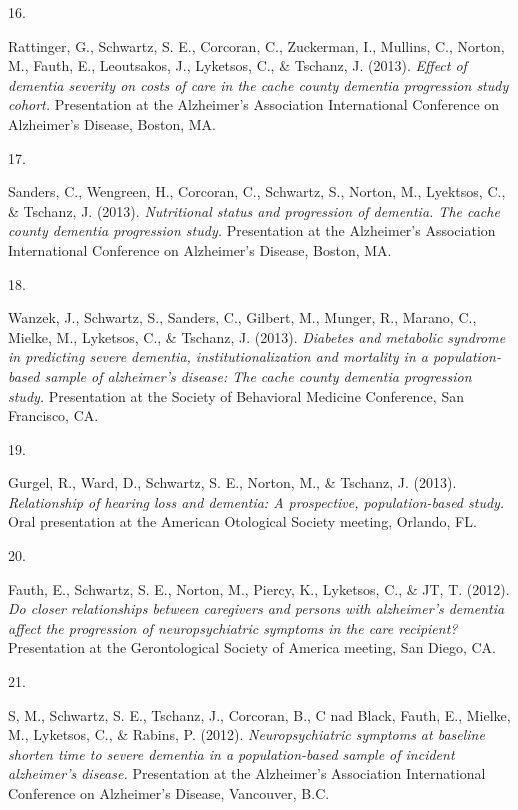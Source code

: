 \documentclass[11pt,a4paper,]{moderncv}
\newlength{\csllabelwidth}
\newcommand{\CSLLeftMargin}[1]{\parbox[t]{\csllabelwidth}{#1}}
\newcommand{\CSLRightInline}[1]{\parbox[t]{\linewidth - \csllabelwidth}{#1}}
\begin{document}
\leavevmode\hypertarget{ref-gail2013pres}{}%
\CSLLeftMargin{16. }
\CSLRightInline{Rattinger, G., Schwartz, S. E., Corcoran, C., Zuckerman,
I., Mullins, C., Norton, M., Fauth, E., Leoutsakos, J., Lyketsos, C., \&
Tschanz, J. (2013). \emph{Effect of dementia severity on costs of care
in the cache county dementia progression study cohort.} Presentation at
the Alzheimer's Association International Conference on Alzheimer's
Disease, Boston, MA.}

\leavevmode\hypertarget{ref-sanders2013pres}{}%
\CSLLeftMargin{17. }
\CSLRightInline{Sanders, C., Wengreen, H., Corcoran, C., Schwartz, S.,
Norton, M., Lyektsos, C., \& Tschanz, J. (2013). \emph{Nutritional
status and progression of dementia. The cache county dementia
progression study.} Presentation at the Alzheimer's Association
International Conference on Alzheimer's Disease, Boston, MA.}

\leavevmode\hypertarget{ref-wanzek2013pres}{}%
\CSLLeftMargin{18. }
\CSLRightInline{Wanzek, J., Schwartz, S., Sanders, C., Gilbert, M.,
Munger, R., Marano, C., Mielke, M., Lyketsos, C., \& Tschanz, J. (2013).
\emph{Diabetes and metabolic syndrome in predicting severe dementia,
institutionalization and mortality in a population-based sample of
alzheimer's disease: The cache county dementia progression study.}
Presentation at the Society of Behavioral Medicine Conference, San
Francisco, CA.}

\leavevmode\hypertarget{ref-gurgel2013pres}{}%
\CSLLeftMargin{19. }
\CSLRightInline{Gurgel, R., Ward, D., Schwartz, S. E., Norton, M., \&
Tschanz, J. (2013). \emph{Relationship of hearing loss and dementia: A
prospective, population-based study.} Oral presentation at the American
Otological Society meeting, Orlando, FL.}

\leavevmode\hypertarget{ref-beth2012pres}{}%
\CSLLeftMargin{20. }
\CSLRightInline{Fauth, E., Schwartz, S. E., Norton, M., Piercy, K.,
Lyketsos, C., \& JT, T. (2012). \emph{Do closer relationships between
caregivers and persons with alzheimer's dementia affect the progression
of neuropsychiatric symptoms in the care recipient?} Presentation at the
Gerontological Society of America meeting, San Diego, CA.}

\leavevmode\hypertarget{ref-steinberg2012pres}{}%
\CSLLeftMargin{21. }
\CSLRightInline{S, M., Schwartz, S. E., Tschanz, J., Corcoran, B., C nad
Black, Fauth, E., Mielke, M., Lyketsos, C., \& Rabins, P. (2012).
\emph{Neuropsychiatric symptoms at baseline shorten time to severe
dementia in a population-based sample of incident alzheimer's disease.}
Presentation at the Alzheimer's Association International Conference on
Alzheimer's Disease, Vancouver, B.C.}
\end{document}
